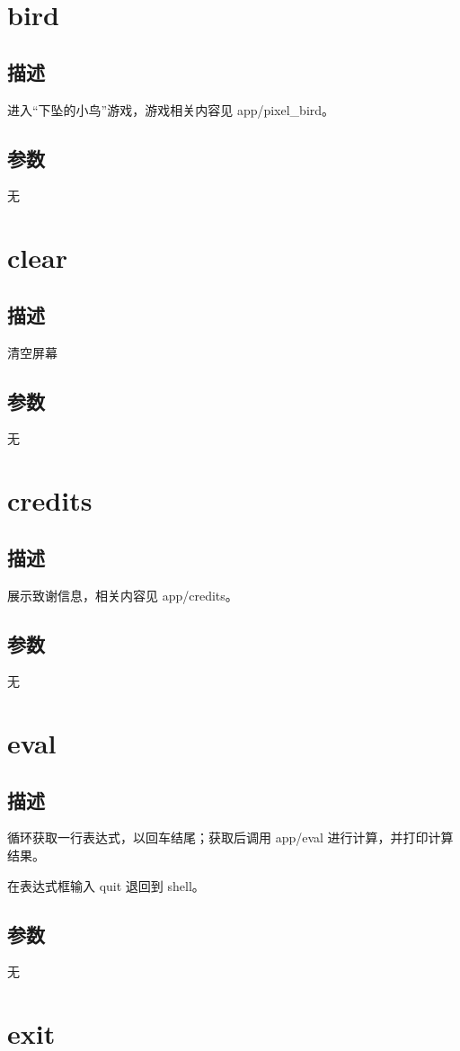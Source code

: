 \section{bird}
\subsection{描述}
进入“下坠的小鸟”游戏，游戏相关内容见 app/pixel\_bird。
\subsection{参数}
无

\section{clear}
\subsection{描述}
清空屏幕
\subsection{参数}
无

\section{credits}
\subsection{描述}
展示致谢信息，相关内容见 app/credits。
\subsection{参数}
无

\section{eval}
\subsection{描述}
循环获取一行表达式，以回车结尾；获取后调用 app/eval 进行计算，并打印计算结果。

在表达式框输入 quit 退回到 shell。
\subsection{参数}
无

\section{exit}
